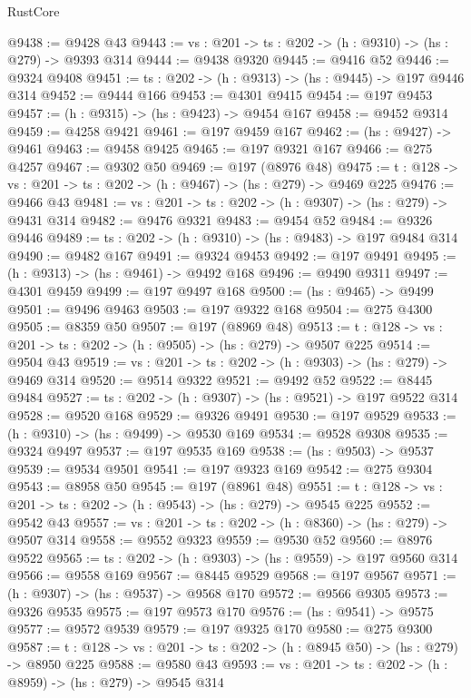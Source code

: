 \begin{lexlean}{RustCore}
\begin{coremodule}
@9438 := @9428 @43
@9443 := {vs : @201} -> {ts : @202} -> (h : @9310) -> (hs : @279) -> @9393 @314
@9444 := @9438 @9320
@9445 := @9416 @52
@9446 := @9324 @9408
@9451 := {ts : @202} -> (h : @9313) -> (hs : @9445) -> @197 @9446 @314
@9452 := @9444 @166
@9453 := @4301 @9415
@9454 := @197 @9453
@9457 := (h : @9315) -> (hs : @9423) -> @9454 @167
@9458 := @9452 @9314
@9459 := @4258 @9421
@9461 := @197 @9459 @167
@9462 := (hs : @9427) -> @9461
@9463 := @9458 @9425
@9465 := @197 @9321 @167
@9466 := @275 @4257
@9467 := @9302 @50
@9469 := @197 (@8976 @48)
@9475 := {t : @128} -> {vs : @201} -> {ts : @202} -> (h : @9467) -> (hs : @279) -> @9469 @225
@9476 := @9466 @43
@9481 := {vs : @201} -> {ts : @202} -> (h : @9307) -> (hs : @279) -> @9431 @314
@9482 := @9476 @9321
@9483 := @9454 @52
@9484 := @9326 @9446
@9489 := {ts : @202} -> (h : @9310) -> (hs : @9483) -> @197 @9484 @314
@9490 := @9482 @167
@9491 := @9324 @9453
@9492 := @197 @9491
@9495 := (h : @9313) -> (hs : @9461) -> @9492 @168
@9496 := @9490 @9311
@9497 := @4301 @9459
@9499 := @197 @9497 @168
@9500 := (hs : @9465) -> @9499
@9501 := @9496 @9463
@9503 := @197 @9322 @168
@9504 := @275 @4300
@9505 := @8359 @50
@9507 := @197 (@8969 @48)
@9513 := {t : @128} -> {vs : @201} -> {ts : @202} -> (h : @9505) -> (hs : @279) -> @9507 @225
@9514 := @9504 @43
@9519 := {vs : @201} -> {ts : @202} -> (h : @9303) -> (hs : @279) -> @9469 @314
@9520 := @9514 @9322
@9521 := @9492 @52
@9522 := @8445 @9484
@9527 := {ts : @202} -> (h : @9307) -> (hs : @9521) -> @197 @9522 @314
@9528 := @9520 @168
@9529 := @9326 @9491
@9530 := @197 @9529
@9533 := (h : @9310) -> (hs : @9499) -> @9530 @169
@9534 := @9528 @9308
@9535 := @9324 @9497
@9537 := @197 @9535 @169
@9538 := (hs : @9503) -> @9537
@9539 := @9534 @9501
@9541 := @197 @9323 @169
@9542 := @275 @9304
@9543 := @8958 @50
@9545 := @197 (@8961 @48)
@9551 := {t : @128} -> {vs : @201} -> {ts : @202} -> (h : @9543) -> (hs : @279) -> @9545 @225
@9552 := @9542 @43
@9557 := {vs : @201} -> {ts : @202} -> (h : @8360) -> (hs : @279) -> @9507 @314
@9558 := @9552 @9323
@9559 := @9530 @52
@9560 := @8976 @9522
@9565 := {ts : @202} -> (h : @9303) -> (hs : @9559) -> @197 @9560 @314
@9566 := @9558 @169
@9567 := @8445 @9529
@9568 := @197 @9567
@9571 := (h : @9307) -> (hs : @9537) -> @9568 @170
@9572 := @9566 @9305
@9573 := @9326 @9535
@9575 := @197 @9573 @170
@9576 := (hs : @9541) -> @9575
@9577 := @9572 @9539
@9579 := @197 @9325 @170
@9580 := @275 @9300
@9587 := {t : @128} -> {vs : @201} -> {ts : @202} -> (h : @8945 @50) -> (hs : @279) -> @8950 @225
@9588 := @9580 @43
@9593 := {vs : @201} -> {ts : @202} -> (h : @8959) -> (hs : @279) -> @9545 @314

\end{coremodule}
\end{lexlean}

